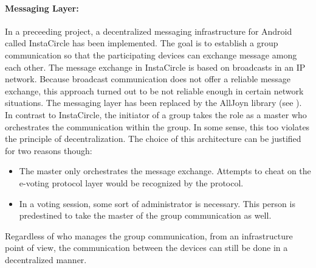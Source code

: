 \documentclass[numbers=noenddot, abstract=on, a4paper, headsepline,
footsepline, oneside, draft=off]{scrreprt}
\newcommand{\myref}[1]{(see \Vref{#1})}
\begin{document}
\paragraph{Messaging Layer:} In a preceeding project, a decentralized messaging
infrastructure for Android called InstaCircle \cite{ritter13a} has been
implemented. The goal is to establish a group communication so that the
participating devices can exchange message among each other. The message
exchange in InstaCircle is based on broadcasts in an IP network.
Because broadcast communication does not offer a reliable message exchange, this
approach turned out to be not reliable enough in certain network situations. The
messaging layer has been replaced by the AllJoyn library \myref{sec:alljoyn}.
In contrast to InstaCircle, the initiator of a group takes the role as a master
who orchestrates the communication within the group. In some sense, this too
violates the principle of decentralization. The choice of this architecture can
be justified for two reasons though: 
\begin{itemize}
  \item The master only orchestrates the message exchange. Attempts to cheat on
  the e-voting protocol layer would be recognized by the protocol.
  \item In a voting session, some sort of administrator is necessary. This
  person is predestined to take the master of the group communication as well.
\end{itemize}
Regardless of who manages the group communication, from an infrastructure point
of view, the communication between the devices can still be done in a
decentralized manner.
\end{document}
